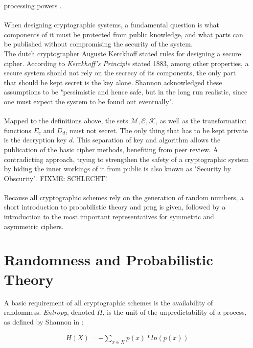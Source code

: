 processing powers \cite{GoldwasserMicali}.
\\
\\
When designing cryptographic systems, a fundamental question is what components of it must be protected from public knowledge, and what parts can be
published without compromising the security of the system. 
\\
The dutch cryptographer Auguste Kerckhoff stated rules for designing a secure cipher.
According to \textit{Kerckhoff's Principle} stated 1883, among other properties, a secure system should not rely on the secrecy of
its components, the only part that should be kept secret is the key alone. Shannon acknowledged these assumptions to be "pessimistic and hence safe, but 
in the long run realistic, since one must expect the system to be found out eventually".
\\
\\
Mapped to the definitions above, the sets $\mathcal{M, C, K}$, as well as the
transformation functions $E_e$ and $D_d$, must not secret. The only thing that has to be kept private is the decryption key $d$.
This separation of key and algorithm allows the publication of the basic cipher methods, benefiting from peer review. A contradicting approach, 
trying to strengthen the safety of a cryptographic system by hiding the inner workings of it from public is also known as "Security by Obscurity". FIXME: SCHLECHT!
\\
\\
Because all cryptographic schemes rely on the generation of random numbers, a short introduction to probabilistic theory and \gls{prng} is given,
followed by a introduction to the most important representatives for symmetric and asymmetric ciphers.

\section{Randomness and Probabilistic Theory}

A basic requirement of all cryptographic schemes is the availability of randomness. \textit{Entropy}, denoted $H$, is the unit of the unpredictability of a process, as
 defined by Shannon in \cite{6773024}:
 
\begin{align}
 H(X) = - \sum_{x \in X}^{} p(x) * ln(p(x))
\end{align}


